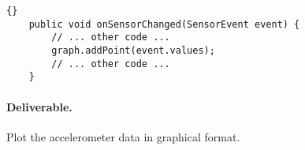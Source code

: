 \documentclass[10pt]{article}
\begin{document}
\begin{lstlisting}{}
    public void onSensorChanged(SensorEvent event) {
    	// ... other code ...
        graph.addPoint(event.values);
        // ... other code ...
    }
\end{lstlisting}

\paragraph{Deliverable.} Plot the accelerometer data in graphical format.






\end{document}
